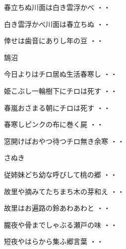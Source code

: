 \begin{shiika}春立ちぬ川面は白き雲浮かべ
\hfill{・・}\end{shiika}
\vspace{0.6cm}
\begin{shiika}白き雲浮かべ川面は春立ちぬ
\hfill{・・}\end{shiika}
\begin{shiika}倖せは歯音にありし年の豆
\hfill{・・}\end{shiika}
\vspace{0.6cm}
鵠沼
\begin{shiika}今日よりはチロ居ぬ生活春寒し
\hfill{・・}\end{shiika}
\vspace{0.6cm}
\begin{shiika}姫こぶし一輪樹下にチロは死す
\hfill{・・}\end{shiika}
\vspace{0.6cm}
\begin{shiika}春嵐おさまる朝にチロは死す
\hfill{・・}\end{shiika}
\vspace{0.6cm}
\begin{shiika}春寒しピンクの布に巻く屍
\hfill{・・}\end{shiika}
\vspace{0.6cm}
\begin{shiika}窓開けばおやつ待つチロ無き余寒
\hfill{・・}\end{shiika}
\vspace{0.6cm}
さぬき
\begin{shiika}従姉妹どち幼な呼びして桃の郷
\hfill{・・}\end{shiika}
\begin{shiika}故里や摘みてたちまち木の芽和え
\hfill{・・}\end{shiika}
\begin{shiika}故里はお遍路の鈴あわあわと
\hfill{・・}\end{shiika}
\begin{shiika}朧夜や骨までしゃぶる瀬戸の味
\hfill{・・}\end{shiika}
\begin{shiika}短夜やはらから集ふ郷言葉
\hfill{・・}\end{shiika}
